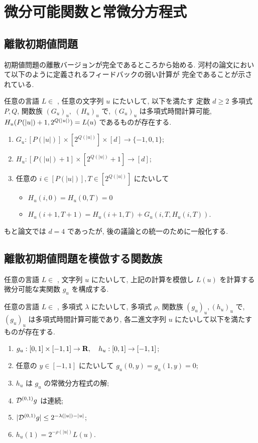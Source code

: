 \section{微分可能関数と常微分方程式}

\subsection{離散初期値問題}

初期値問題の離散バージョンが\PSPACE 完全であるところから始める.
河村の論文において以下のように定義されるフィードバックの弱い計算が
\PSPACE 完全であることが示されている.

\begin{lemma}
 \label{WeakFeedback}
 任意の言語 $L \in $ \PSPACE, 任意の文字列 $u$ にたいして, 以下を満たす
 定数 $d \ge 2$ 多項式 $P, Q$, 関数族 $(G_u)_u,$ $(H_u)_u$ で,
 $(G_u)_u$ は多項式時間計算可能, $H_u({P(|u|)} +1, 2^{Q(|u|)}) = L(u)$
 であるものが存在する.
 \begin{enumerate}
  \item $G_u: [P(|u|)] \times [2^{Q(|u|)}] \times [d] \to \{-1, 0, 1\}$;
  \item $H_u: [P(|u|) + 1] \times [2^{Q(|u|)} + 1] \to [d]$;
  \item 任意の $i \in [P(|u|)], T \in [2^{Q(|u|)}]$ にたいして 
	\begin{itemize}
	 \item $H_u(i, 0) = H_u(0, T) = 0$
	 \item $H_u(i + 1, T + 1) = H_u(i+1, T) + G_u(i, T, H_u(i, T))$.
	\end{itemize} 
 \end{enumerate}
\end{lemma}

もと論文では $d=4$ であったが, 後の議論との統一のために一般化する.


\subsection{離散初期値問題を模倣する関数族}

任意の言語 $L \in $ \PSPACE, 文字列 $u$ にたいして,
上記の計算を模倣し $L(u)$ を計算する微分可能な実関数 $g_u$ を構成する.

\begin{lemma}
 \label{DifferentiableFamily}
 任意の言語 $L \in $ \PSPACE, 多項式 $\lambda$ にたいして,
 多項式 $\rho$, 関数族 $(g_u)_u, (h_u)_u$ で, 
 $(g_u)_u$ は多項式時間計算可能であり,
 各二進文字列 $u$ にたいして以下を満たすものが存在する.
 \begin{enumerate}
  \item $g_u:[0,1] \times [-1,1]\to \mathbf R, \quad h_u: [0,1] \to [-1,1]$;
  \item 任意の $y \in [-1,1]$ にたいして $g_u(0,y) = g_u(1,y) = 0 $; 
  \item $h_u$ は $g_u$ の常微分方程式の解; 
  \item $\mathcal D^{(0,1)} g$ は連続;
  \item $|\mathcal D^{(0,1)} g| \leq 2^{-\lambda(|u|) - |u| } $;
  \item $h_u(1) = 2^{-\rho(|u|)}L(u)$.
 \end{enumerate}
\end{lemma}

